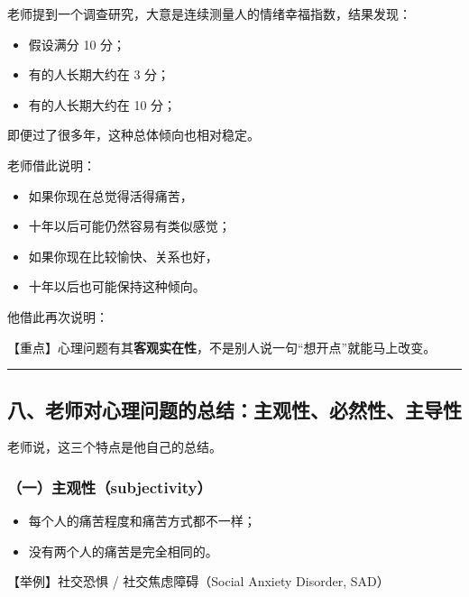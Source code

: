 \documentclass[
  chinese,
  9pt,
  a4paper,
]{ctexart}
\providecommand{\tightlist}{%
  \setlength{\itemsep}{0pt}\setlength{\parskip}{0pt}}
\begin{document}
老师提到一个调查研究，大意是连续测量人的情绪幸福指数，结果发现：

\begin{itemize}
\tightlist
\item
  假设满分 10 分；
\item
  有的人长期大约在 3 分；
\item
  有的人长期大约在 10 分；
\end{itemize}

即便过了很多年，这种总体倾向也相对稳定。

老师借此说明：

\begin{itemize}
\tightlist
\item
  如果你现在总觉得活得痛苦，
\item
  十年以后可能仍然容易有类似感觉；
\item
  如果你现在比较愉快、关系也好，
\item
  十年以后也可能保持这种倾向。
\end{itemize}

他借此再次说明：

【重点】心理问题有其\textbf{客观实在性}，不是别人说一句``想开点''就能马上改变。

\begin{center}\rule{0.5\linewidth}{0.5pt}\end{center}

\subsection{八、老师对心理问题的总结：主观性、必然性、主导性}\label{ux516bux8001ux5e08ux5bf9ux5fc3ux7406ux95eeux9898ux7684ux603bux7ed3ux4e3bux89c2ux6027ux5fc5ux7136ux6027ux4e3bux5bfcux6027}

老师说，这三个特点是他自己的总结。

\subsubsection{（一）主观性（subjectivity）}\label{ux4e00ux4e3bux89c2ux6027subjectivity}

\begin{itemize}
\tightlist
\item
  每个人的痛苦程度和痛苦方式都不一样；
\item
  没有两个人的痛苦是完全相同的。
\end{itemize}

【举例】社交恐惧 / 社交焦虑障碍（Social Anxiety Disorder, SAD）
\end{document}

